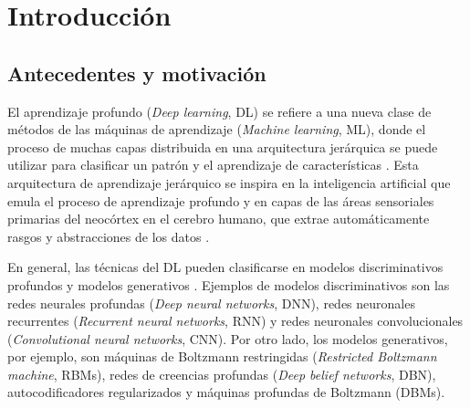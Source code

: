 \chapter{Introducción}
\section{Antecedentes y motivación}
El aprendizaje profundo ({\em Deep learning}, DL) se refiere a una nueva clase de métodos de las máquinas de aprendizaje ({\em Machine learning}, ML), donde el proceso de muchas capas distribuida en una arquitectura jerárquica se puede utilizar para clasificar un patrón y el aprendizaje de características \cite{Hinton2006, Bengio2009}. Esta arquitectura de aprendizaje jerárquico se inspira en la inteligencia artificial que emula el proceso de aprendizaje profundo y en capas de las áreas sensoriales primarias del neocórtex en el cerebro humano, que extrae automáticamente rasgos y abstracciones de los datos \cite{Bengio2007, Bengio2013, Arel2010}. %

En general, las técnicas del DL pueden clasificarse en modelos discriminativos profundos y modelos generativos \cite{Deng2014}. Ejemplos de modelos discriminativos son las redes neurales profundas ({\em Deep neural networks}, DNN), redes neuronales recurrentes ({\em Recurrent neural networks}, RNN) y redes neuronales convolucionales ({\em Convolutional neural networks}, CNN). Por otro lado, los modelos generativos, por ejemplo, son máquinas de Boltzmann restringidas ({\em Restricted Boltzmann machine}, RBMs), redes de creencias profundas ({\em Deep belief networks}, DBN), autocodificadores regularizados y máquinas profundas de Boltzmann (DBMs). %


